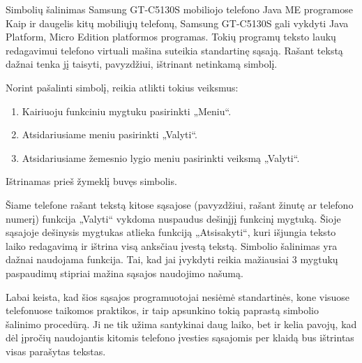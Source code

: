 \begin{xcase}{Simbolių šalinimas Samsung GT-C5130S mobiliojo telefono
              Java ME programose}
  \xcgoal
  {
    Kaip ir daugelis kitų mobiliųjų telefonų, Samsung GT-C5130S gali vykdyti
    Java Platform, Micro Edition platformos programas. Tokių programų
    teksto laukų redagavimui telefono virtuali mašina suteikia standartinę
    sąsają. Rašant tekstą dažnai tenka jį taisyti, pavyzdžiui, ištrinant
    netinkamą simbolį.
  }
  
  \xctools
  {
    Norint pašalinti simbolį, reikia atlikti tokius veiksmus:
    \begin{enumerate} %
      \item Kairiuoju funkciniu mygtuku pasirinkti „Meniu“.
      \item Atsidariusiame meniu pasirinkti „Valyti“.
      \item Atsidariusiame žemesnio lygio meniu pasirinkti veiksmą „Valyti“.
    \end{enumerate}
  }
  
  \xcresult
  {
    Ištrinamas prieš žymeklį buvęs simbolis.
  }
  
  \xcprinciples
  {
    {
      Šiame telefone rašant tekstą kitose sąsajose (pavyzdžiui, rašant
      žinutę ar telefono numerį) funkcija „Valyti“ vykdoma nuspaudus
      dešinįjį funkcinį mygtuką. Šioje sąsajoje dešinysis mygtukas atlieka
      funkciją „Atsisakyti“, kuri išjungia teksto laiko redagavimą ir
      ištrina visą anksčiau įvestą tekstą.
    }
    {
      Simbolio šalinimas yra dažnai naudojama funkcija. Tai, kad jai
      įvykdyti reikia mažiausiai 3 mygtukų paspaudimų stipriai mažina
      sąsajos naudojimo našumą.
    }
  }
  
  \xcthoughts
  {
    Labai keista, kad šios sąsajos programuotojai nesiėmė standartinės, kone
    visuose telefonuose taikomos praktikos, ir taip apsunkino tokią paprastą
    simbolio šalinimo procedūrą. Ji ne tik užima santykinai daug laiko, bet
    ir kelia pavojų, kad dėl įpročių naudojantis kitomis telefono įvesties
    sąsajomis per klaidą bus ištrintas visas parašytas tekstas.
  }
\end{xcase}
